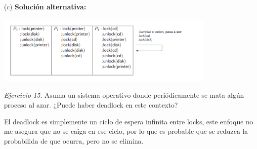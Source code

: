 \documentclass[12pt]{article}
\begin{document}
\begin{rta}
\begin{center}
    \end{center}
    \item[(c)] \textbf{Solución alternativa:} \newline
    \begin{center}
        \includegraphics[width=0.8\textwidth]{c14.png}
    \end{center}
\end{rta}


\noindent \textit{Ejercicio 15}. Asuma un sistema operativo donde periódicamente se mata algún proceso al azar. ¿Puede haber deadlock en este contexto?

\begin{rta}
    El deadlock es simplemente un ciclo de espera infinita entre locks, este enfoque no me asegura que no se caiga en ese ciclo, por lo que es probable que se reduzca la probabilida de que ocurra, pero no se elimina.
\end{rta}
\end{document}

